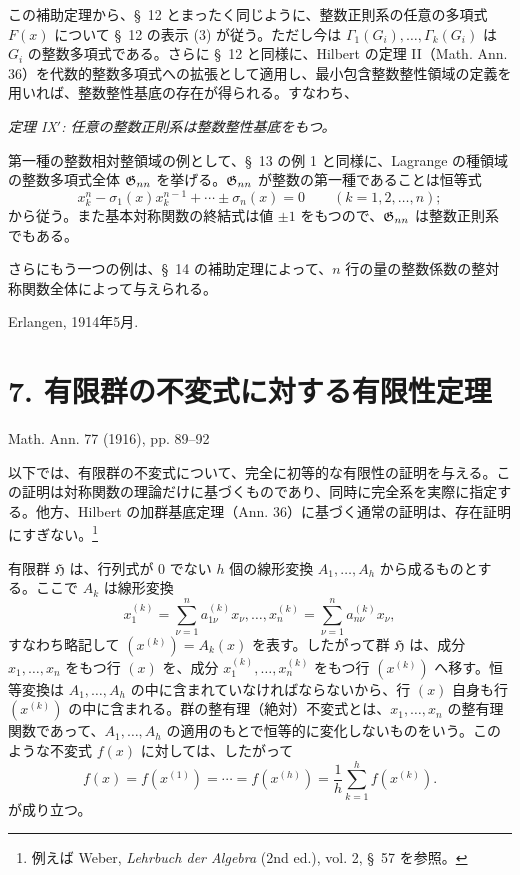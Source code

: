 \documentclass[11pt]{article}
\providecommand{\Hgrp}{\mathfrak{H}}
\begin{document}
この補助定理から、\S\ 12 とまったく同じように、整数正則系の任意の多項式 $F(x)$ について \S\ 12 の表示 (3) が従う。ただし今は $\Gamma_1(G_i),\ldots,\Gamma_k(G_i)$ は $G_i$ の整数多項式である。さらに \S\ 12 と同様に、Hilbert の定理 II（Math. Ann. 36）を代数的整数多項式への拡張として適用し、最小包含整数整性領域の定義を用いれば、整数整性基底の存在が得られる。すなわち、

\emph{定理 IX$'$: 任意の整数正則系は整数整性基底をもつ。}

第一種の整数相対整領域の例として、\S\ 13 の例 1 と同様に、Lagrange の種領域の整数多項式全体 $\mathfrak{G}_{nn}$ を挙げる。$\mathfrak{G}_{nn}$ が整数の第一種であることは恒等式
\[
  x_k^n-\sigma_1(x)x_k^{n-1}+\cdots\pm\sigma_n(x)=0
  \qquad(k=1,2,
\ldots,n);
\]
から従う。また基本対称関数の終結式は値 $\pm1$ をもつので、$\mathfrak{G}_{nn}$ は整数正則系でもある。

さらにもう一つの例は、\S\ 14 の補助定理によって、$n$ 行の量の整数係数の整対称関数全体によって与えられる。

Erlangen, 1914年5月.

\section*{7. 有限群の不変式に対する有限性定理}
\begin{center}
Math. Ann. 77 (1916), pp. 89--92
\end{center}

以下では、有限群の不変式について、完全に初等的な有限性の証明を与える。この証明は対称関数の理論だけに基づくものであり、同時に完全系を実際に指定する。他方、Hilbert の加群基底定理（Ann. 36）に基づく通常の証明は、存在証明にすぎない。\footnote{例えば Weber, \emph{Lehrbuch der Algebra} (2nd ed.), vol. 2, \S\ 57 を参照。}

有限群 $\Hgrp$ は、行列式が 0 でない $h$ 個の線形変換 $A_1,\ldots,A_h$ から成るものとする。ここで $A_k$ は線形変換
\[
  x_1^{(k)}=\sum_{\nu=1}^{n}a_{1\nu}^{(k)}x_\nu,\ldots,
  x_n^{(k)}=\sum_{\nu=1}^{n}a_{n\nu}^{(k)}x_\nu,
\]
すなわち略記して $(x^{(k)})=A_k(x)$ を表す。したがって群 $\Hgrp$ は、成分 $x_1,
\ldots,x_n$ をもつ行 $(x)$ を、成分 $x_1^{(k)},
\ldots,x_n^{(k)}$ をもつ行 $(x^{(k)})$ へ移す。恒等変換は $A_1,
\ldots,A_h$ の中に含まれていなければならないから、行 $(x)$ 自身も行 $(x^{(k)})$ の中に含まれる。群の整有理（絶対）不変式とは、$x_1,
\ldots,x_n$ の整有理関数であって、$A_1,
\ldots,A_h$ の適用のもとで恒等的に変化しないものをいう。このような不変式 $f(x)$ に対しては、したがって
\begin{equation}
  f(x)=f(x^{(1)})=\cdots=f(x^{(h)})=
  \frac1h\sum_{k=1}^{h}f(x^{(k)}).
\tag{1}
\end{equation}
が成り立つ。
\end{document}
